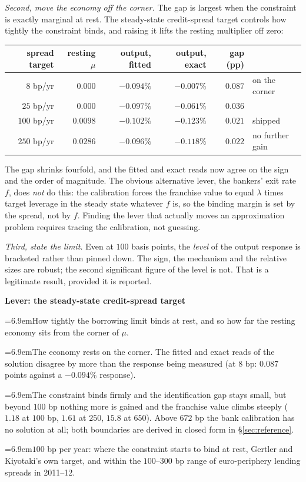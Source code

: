 \documentclass[10pt,a4paper]{article}
\newcommand{\leverrow}[2]{\par\noindent\hangindent=6.9em\hangafter=1\makebox[6.9em][l]{\textit{#1}}#2}
\newenvironment{lever}[1]{\par\begin{framed}\small\noindent\textcolor{levcol}{\textbf{Lever: #1}}\par\vspace{2pt}}{\end{framed}}
\theoremstyle{plain}
\theoremstyle{remark}
\begin{document}
\emph{Second, move the economy off the corner.} The gap is largest when the constraint is exactly
marginal at rest. The steady-state credit-spread target controls how tightly the constraint binds,
and raising it lifts the resting multiplier off zero:

\begin{center}\small
\begin{tabular}{@{}rrrrrl@{}}
\toprule
spread target & resting $\mu$ & output, fitted & output, exact & gap (pp) & \\
\midrule
$8$ bp/yr   & $0.000$  & $-0.094\%$ & $-0.007\%$ & $0.087$ & on the corner\\
$25$ bp/yr  & $0.000$  & $-0.097\%$ & $-0.061\%$ & $0.036$ & \\
$100$ bp/yr & $0.0098$ & $-0.102\%$ & $-0.123\%$ & $\mathbf{0.021}$ & shipped\\
$250$ bp/yr & $0.0286$ & $-0.096\%$ & $-0.118\%$ & $0.022$ & no further gain\\
\bottomrule
\end{tabular}
\end{center}

\noindent The gap shrinks fourfold, and the fitted and exact reads now agree on the sign and the
order of magnitude. The obvious alternative lever, the bankers' exit rate $f$, does \emph{not} do
this: the calibration forces the franchise value to equal $\lambda$ times target leverage in the
steady state whatever $f$ is, so the binding margin is set by the spread, not by $f$. Finding the
lever that actually moves an approximation problem requires tracing the calibration, not guessing.

\emph{Third, state the limit.} Even at $100$ basis points, the \emph{level} of the output response is
bracketed rather than pinned down. The sign, the mechanism and the relative sizes are robust; the
second significant figure of the level is not. That is a legitimate result, provided it is reported.

\begin{lever}{the steady-state credit-spread target}
\leverrow{Controls}{How tightly the borrowing limit binds at rest, and so how far the resting economy
sits from the corner of $\mu$.}
\leverrow{Push small}{The economy rests on the corner. The fitted and exact reads of the solution
disagree by more than the response being measured (at $8$ bp: $0.087$ points against a $-0.094\%$
response).}
\leverrow{Push large}{The constraint binds firmly and the identification gap stays small, but beyond
$100$ bp nothing more is gained and the franchise value climbs steeply ($1.18$ at $100$ bp, $1.61$ at
$250$, $15.8$ at $650$). Above $672$ bp the bank calibration has no solution at all; both
boundaries are derived in closed form in \S\ref{sec:reference}.}
\leverrow{Here}{$100$ bp per year: where the constraint starts to bind at rest, Gertler and
Kiyotaki's own target, and within the $100$--$300$ bp range of euro-periphery lending spreads in
2011--12.}
\end{lever}
\end{document}
